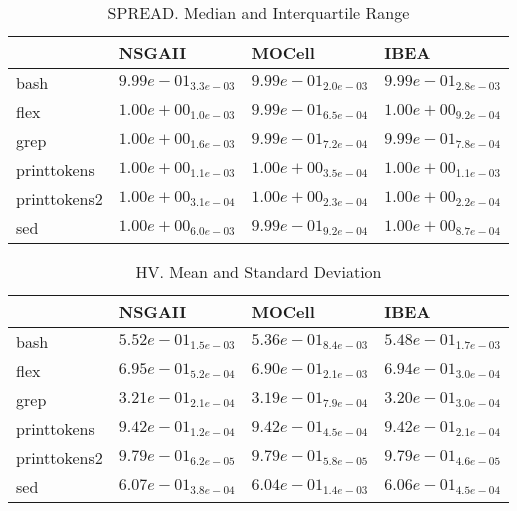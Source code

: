 \documentclass{article}
\begin{document}
\begin{table}
\caption{SPREAD. Median and Interquartile Range}
\label{table: SPREAD}
\centering
\begin{scriptsize}
\begin{tabular}{llll}
\hline & NSGAII & MOCell &  IBEA\\
\hline 
bash & $  9.99e-01_{ 3.3e-03}$ & \cellcolor{gray25}$  9.99e-01_{ 2.0e-03}$ & \cellcolor{gray95}$  9.99e-01_{ 2.8e-03}$ \\
flex & $  1.00e+00_{ 1.0e-03}$ & \cellcolor{gray95}$  9.99e-01_{ 6.5e-04}$ & \cellcolor{gray25}$  1.00e+00_{ 9.2e-04}$ \\
grep & $  1.00e+00_{ 1.6e-03}$ & \cellcolor{gray95}$  9.99e-01_{ 7.2e-04}$ & \cellcolor{gray25}$  9.99e-01_{ 7.8e-04}$ \\
printtokens & \cellcolor{gray25}$  1.00e+00_{ 1.1e-03}$ & \cellcolor{gray95}$  1.00e+00_{ 3.5e-04}$ & $  1.00e+00_{ 1.1e-03}$ \\
printtokens2 & $  1.00e+00_{ 3.1e-04}$ & \cellcolor{gray95}$  1.00e+00_{ 2.3e-04}$ & \cellcolor{gray25}$  1.00e+00_{ 2.2e-04}$ \\
sed & $  1.00e+00_{ 6.0e-03}$ & \cellcolor{gray95}$  9.99e-01_{ 9.2e-04}$ & \cellcolor{gray25}$  1.00e+00_{ 8.7e-04}$ \\
\hline
\end{tabular}
\end{scriptsize}
\end{table}

\begin{table}
\caption{HV. Mean and Standard Deviation}
\label{table: HV}
\centering
\begin{scriptsize}
\begin{tabular}{llll}
\hline & NSGAII & MOCell &  IBEA\\
\hline 
bash & \cellcolor{gray95}$  5.52e-01_{ 1.5e-03}$ & $  5.36e-01_{ 8.4e-03}$ & \cellcolor{gray25}$  5.48e-01_{ 1.7e-03}$ \\
flex & \cellcolor{gray95}$  6.95e-01_{ 5.2e-04}$ & $  6.90e-01_{ 2.1e-03}$ & \cellcolor{gray25}$  6.94e-01_{ 3.0e-04}$ \\
grep & \cellcolor{gray95}$  3.21e-01_{ 2.1e-04}$ & $  3.19e-01_{ 7.9e-04}$ & \cellcolor{gray25}$  3.20e-01_{ 3.0e-04}$ \\
printtokens & \cellcolor{gray95}$  9.42e-01_{ 1.2e-04}$ & $  9.42e-01_{ 4.5e-04}$ & \cellcolor{gray25}$  9.42e-01_{ 2.1e-04}$ \\
printtokens2 & \cellcolor{gray25}$  9.79e-01_{ 6.2e-05}$ & $  9.79e-01_{ 5.8e-05}$ & \cellcolor{gray95}$  9.79e-01_{ 4.6e-05}$ \\
sed & \cellcolor{gray95}$  6.07e-01_{ 3.8e-04}$ & $  6.04e-01_{ 1.4e-03}$ & \cellcolor{gray25}$  6.06e-01_{ 4.5e-04}$ \\
\hline
\end{tabular}
\end{scriptsize}
\end{table}
\end{document}

